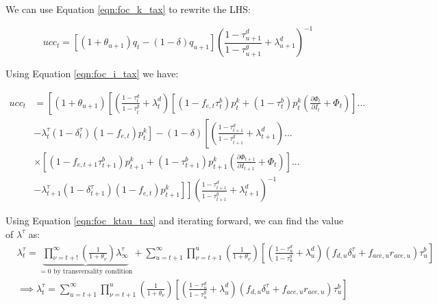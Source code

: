 We can use Equation \ref{eqn:foc_k_tax} to rewrite the LHS:

\begin{equation}
ucc_{t} =  \left[\left({1+\theta_{u+1}}\right)q_{t} - (1-\delta)q_{u+1}\right] \left(\frac{1-\tau^{d}_{u+1}}{1-\tau^{g}_{u+1}} + \lambda^{d}_{u+1} \right)^{-1}
\end{equation}

Using Equation \ref{eqn:foc_i_tax} we have:

\begin{equation}
\begin{split}
ucc_{t} &=  \left[\left({1+\theta_{u+1}}\right)\left[\left(\frac{1-\tau^{d}_{t}}{1-\tau^{g}_{t}} + \lambda^{d}_{t}\right)\left[(1-f_{e,t}\tau^{b}_{t})p^{k}_{t}+ (1-\tau^{b}_{t})p^{k}_{t}\left(\frac{\partial \Phi_{t}}{\partial I_{t}} + \Phi_{t}\right)\right]... \right.\right. \\
& \left.\left. -\lambda^{\tau}_{t}(1-\delta^{\tau}_{t})(1-f_{e,t})p^{k}_{t}\right] - (1-\delta)\left[\left(\frac{1-\tau^{d}_{t+1}}{1-\tau^{g}_{t+1}} + \lambda^{d}_{t+1}\right)... \right.\right. \\
& \left.\left. \times \left[(1-f_{e,t+1}\tau^{b}_{t+1})p^{k}_{t+1}+ (1-\tau^{b}_{t+1})p^{k}_{t+1}\left(\frac{\partial \Phi_{t+1}}{\partial I_{t+1}} + \Phi_{t}\right)\right]... \right.\right. \\
& \left.\left. -\lambda^{\tau}_{t+1}(1-\delta^{\tau}_{t+1})(1-f_{e,t})p^{k}_{t+1}\right]\right] \left(\frac{1-\tau^{d}_{t+1}}{1-\tau^{g}_{t+1}} + \lambda^{d}_{t+1} \right)^{-1}
\end{split}
\end{equation}


Using Equation \ref{eqn:foc_ktau_tax} and iterating forward, we can find the value of $\lambda^{\tau}$ as:
\begin{equation}
\begin{split}
& \lambda^{\tau}_{t}=\underbrace{\prod_{\nu=t+!}^{\infty}\left(\frac{1}{1+\theta_{\nu}}\right)\lambda^{\tau}_{\infty}}_{=0 \text{ by transversality condition}} + \sum_{u=t+1}^{\infty} \prod_{\nu=t+1}^{u}\left(\frac{1}{1+\theta_{\nu}}\right)\left[\left(\frac{1-\tau^{d}_{u}}{1-\tau^{g}_{u}}+\lambda^{d}_{u}\right)\left( f_{d,u}\delta^{\tau}_{u}+f_{ace,u}r_{ace,u} \right)\tau^{b}_{u}\right]\\
&\implies  \lambda^{\tau}_{t}= \sum_{u=t+1}^{\infty} \prod_{\nu=t+1}^{u}\left(\frac{1}{1+\theta_{\nu}}\right)\left[\left(\frac{1-\tau^{d}_{u}}{1-\tau^{g}_{u}}+\lambda^{d}_{u}\right)\left( f_{d,u}\delta^{\tau}_{u}+f_{ace,u}r_{ace,u} \right)\tau^{b}_{u}\right]
\end{split}
\end{equation}

